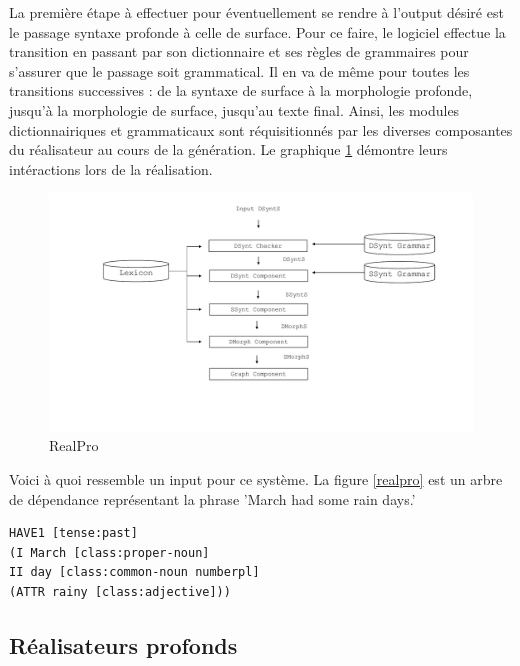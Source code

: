 La première étape à effectuer pour éventuellement se rendre à l'output désiré est le passage syntaxe profonde à celle de surface. Pour ce faire, le logiciel effectue la transition en passant par son dictionnaire et ses règles de grammaires pour s'assurer que le passage soit grammatical. Il en va de même pour toutes les transitions successives : de la syntaxe de surface à la morphologie profonde, jusqu'à la morphologie de surface, jusqu'au texte final. Ainsi, les modules dictionnairiques et grammaticaux sont réquisitionnés par les diverses composantes du réalisateur au cours de la génération. Le graphique \ref{fig:RealPro} démontre leurs intéractions lors de la réalisation.
\begin{figure}[htb]
	\centering
	\includegraphics[width=1\textwidth, trim = {0cm 0cm 0cm 0cm},clip]{ch2/figs/realpro.pdf}
	\caption{RealPro}
	\label{fig:RealPro}
\end{figure}

Voici à quoi ressemble un input pour ce système. La figure \ref{realpro} est un arbre de dépendance représentant la phrase  'March had some rain days.'
\begin{lstlisting}[language=Xml, caption=Input, label=realpro]
HAVE1 [tense:past]
(I March [class:proper-noun]
II day [class:common-noun numberpl]
(ATTR rainy [class:adjective]))
\end{lstlisting}



\subsection{Réalisateurs profonds}

